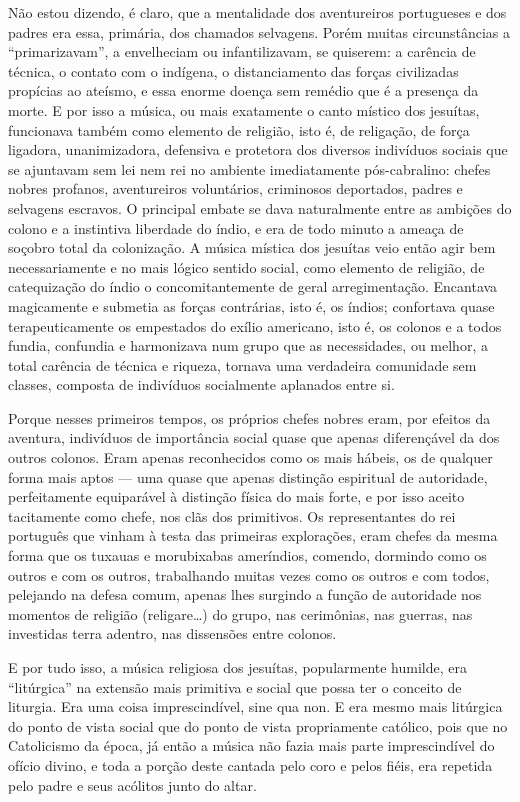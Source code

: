 Não estou dizendo, é claro, que a mentalidade dos aventureiros
portugueses e dos padres era essa, primária, dos chamados selvagens.
Porém muitas circunstâncias a ``primarizavam'', a envelheciam ou
infantilizavam, se quiserem: a carência de técnica, o contato com o
indígena, o distanciamento das forças civilizadas propícias ao ateísmo,
e essa enorme doença sem remédio que é a presença da morte. E por isso a
música, ou mais exatamente o canto místico dos jesuítas, funcionava
também como elemento de religião, isto é, de religação, de força
ligadora, unanimizadora, defensiva e protetora dos diversos indivíduos
sociais que se ajuntavam sem lei nem rei no ambiente imediatamente
pós-cabralino: chefes nobres profanos, aventureiros voluntários,
criminosos deportados, padres e selvagens escravos. O principal embate
se dava naturalmente entre as ambições do colono e a instintiva
liberdade do índio, e era de todo minuto a ameaça de soçobro total da
colonização. A música mística dos jesuítas veio então agir bem
necessariamente e no mais lógico sentido social, como elemento de
religião, de catequização do índio o concomitantemente de geral
arregimentação. Encantava magicamente e submetia as forças contrárias,
isto é, os índios; confortava quase terapeuticamente os empestados do
exílio americano, isto é, os colonos e a todos fundia, confundia e
harmonizava num grupo que as necessidades, ou melhor, a total carência
de técnica e riqueza, tornava uma verdadeira comunidade sem classes,
composta de indivíduos socialmente aplanados entre si.

Porque nesses primeiros tempos, os próprios chefes nobres eram, por
efeitos da aventura, indivíduos de importância social quase que apenas
diferençável da dos outros colonos. Eram apenas reconhecidos como os
mais hábeis, os de qualquer forma mais aptos --- uma quase que apenas
distinção espiritual de autoridade, perfeitamente equiparável à
distinção física do mais forte, e por isso aceito tacitamente como
chefe, nos clãs dos primitivos. Os representantes do rei português que
vinham à testa das primeiras explorações, eram chefes da mesma forma que
os tuxauas e morubixabas ameríndios, comendo, dormindo como os outros e
com os outros, trabalhando muitas vezes como os outros e com todos,
pelejando na defesa comum, apenas lhes surgindo a função de autoridade
nos momentos de religião (religare\ldots{}) do grupo, nas cerimônias, nas
guerras, nas investidas terra adentro, nas dissensões entre colonos.

E por tudo isso, a música religiosa dos jesuítas, popularmente humilde,
era ``litúrgica'' na extensão mais primitiva e social que possa ter o
conceito de liturgia. Era uma coisa imprescindível, sine qua non. E era
mesmo mais litúrgica do ponto de vista social que do ponto de vista
propriamente católico, pois que no Catolicismo da época, já então a
música não fazia mais parte imprescindível do ofício divino, e toda a
porção deste cantada pelo coro e pelos fiéis, era repetida pelo padre e
seus acólitos junto do altar.

